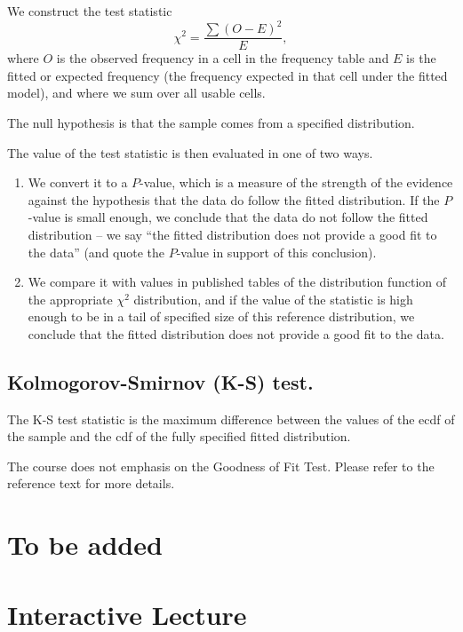 \documentclass[
]{book}
\theoremstyle{definition}
\theoremstyle{definition}
\theoremstyle{definition}
\theoremstyle{definition}
\theoremstyle{remark}
\begin{document}
We construct the test statistic \[\chi^2 = \frac{\sum(O - E)^2}{E},\]
where \(O\) is the observed frequency in a cell in the frequency table and
\(E\) is the fitted or expected frequency (the frequency expected in that
cell under the fitted model), and where we sum over all usable cells.

The null hypothesis is that the sample comes from a specified
distribution.

The value of the test statistic is then evaluated in one of two ways.

\begin{enumerate}
\def\labelenumi{\arabic{enumi}.}
\item
  We convert it to a \(P\)-value, which is a measure of the strength of
  the evidence against the hypothesis that the data do follow the
  fitted distribution. If the \(P\)-value is small enough, we conclude
  that the data do not follow the fitted distribution -- we say ``the
  fitted distribution does not provide a good fit to the data'' (and
  quote the \(P\)-value in support of this conclusion).
\item
  We compare it with values in published tables of the distribution
  function of the appropriate \(\chi^2\) distribution, and if the value
  of the statistic is high enough to be in a tail of specified size of
  this reference distribution, we conclude that the fitted
  distribution does not provide a good fit to the data.
\end{enumerate}

\hypertarget{kolmogorov-smirnov-k-s-test.}{%
\section{Kolmogorov-Smirnov (K-S) test.}\label{kolmogorov-smirnov-k-s-test.}}

The K-S test statistic is the maximum difference between the values of
the ecdf of the sample and the cdf of the fully specified fitted
distribution.

The course does not emphasis on the Goodness of Fit Test. Please refer
to the reference text for more details.

\hypertarget{to-be-added}{%
\chapter{To be added}\label{to-be-added}}

\hypertarget{interactive-lecture}{%
\chapter{Interactive Lecture}\label{interactive-lecture}}
\end{document}
